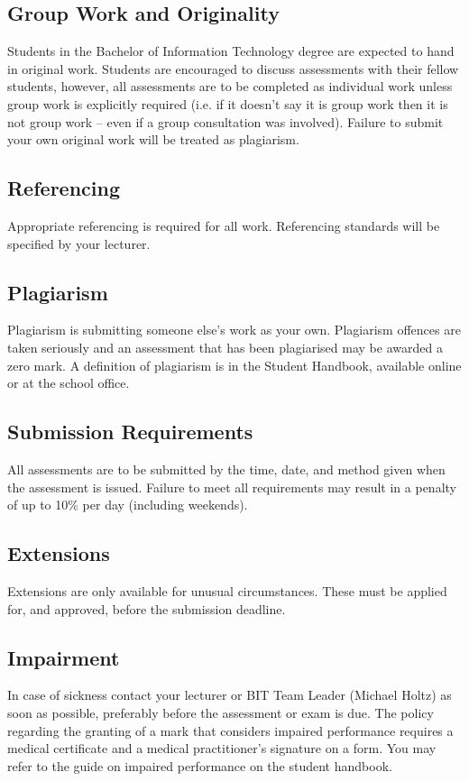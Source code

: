 \documentclass{article}
\begin{document}
\subsection*{Group Work and Originality}
Students in the Bachelor of Information Technology degree are expected to hand in original work. Students are encouraged to discuss assessments with their fellow students, however, all assessments are to be completed as individual work unless group work is explicitly required (i.e. if it doesn’t say it is group work then it is not group work – even if a group consultation was involved). Failure to submit your own original work will be treated as plagiarism.

\subsection*{Referencing}
Appropriate referencing is required for all work. Referencing standards will be specified by your lecturer.

\subsection*{Plagiarism}
Plagiarism is submitting someone else’s work as your own. Plagiarism offences are taken seriously and an assessment that has been plagiarised may be awarded a zero mark. A definition of plagiarism is in the Student Handbook, available online or at the school office.

\subsection*{Submission Requirements}
All assessments are to be submitted by the time, date, and method given when the assessment is issued. Failure to meet all requirements may result in a penalty of up to 10\% per day (including weekends).

\subsection*{Extensions}
Extensions are only available for unusual circumstances. These must be applied for, and approved, before the submission deadline.

\subsection*{Impairment}
In case of sickness contact your lecturer or BIT Team Leader (Michael Holtz) as soon as possible, preferably before the assessment or exam is due. The policy regarding the granting of a mark that considers impaired performance requires a medical certificate and a medical practitioner’s signature on a form. You may refer to the guide on impaired performance on the student handbook.
\end{document}
